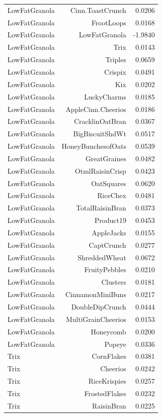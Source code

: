 \begin{longtable}{@{}lrr@{}}
LowFatGranola & Cinn.ToastCrunch & 0.0206 \\
LowFatGranola & FrootLoops & 0.0168 \\
LowFatGranola & LowFatGranola & -1.9840 \\
LowFatGranola & Trix & 0.0143 \\
LowFatGranola & Triples & 0.0659 \\
LowFatGranola & Crispix & 0.0491 \\
LowFatGranola & Kix & 0.0202 \\
LowFatGranola & LuckyCharms & 0.0185 \\
LowFatGranola & AppleCinn.Cheerios & 0.0186 \\
LowFatGranola & CracklinOatBran & 0.0367 \\
LowFatGranola & BigBiscuitShdWt & 0.0517 \\
LowFatGranola & HoneyBunchesofOats & 0.0539 \\
LowFatGranola & GreatGraines & 0.0482 \\
LowFatGranola & OtmlRaisinCrisp & 0.0423 \\
LowFatGranola & OatSquares & 0.0620 \\
LowFatGranola & RiceChex & 0.0481 \\
LowFatGranola & TotalRaisinBran & 0.0373 \\
LowFatGranola & Product19 & 0.0453 \\
LowFatGranola & AppleJacks & 0.0155 \\
LowFatGranola & CaptCrunch & 0.0277 \\
LowFatGranola & ShreddedWheat & 0.0672 \\
LowFatGranola & FruityPebbles & 0.0210 \\
LowFatGranola & Clusters & 0.0181 \\
LowFatGranola & CinnamonMiniBuns & 0.0217 \\
LowFatGranola & DoubleDipCrunch & 0.0444 \\
LowFatGranola & MultiGrainCheerios & 0.0153 \\
LowFatGranola & Honeycomb & 0.0200 \\
LowFatGranola & Popeye & 0.0336 \\
Trix & CornFlakes & 0.0381 \\
Trix & Cheerios & 0.0242 \\
Trix & RiceKrispies & 0.0257 \\
Trix & FrostedFlakes & 0.0232 \\
Trix & RaisinBran & 0.0225 \\

\end{longtable}
